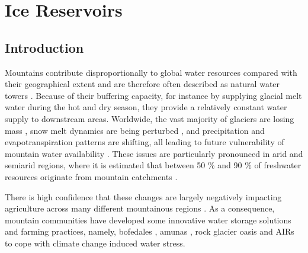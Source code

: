 \chapter{Ice Reservoirs}



\section{Introduction}

Mountains contribute disproportionally to global water resources compared with their geographical extent and are
therefore often described as natural water towers \citep{immerzeelImportanceVulnerabilityWorld2020}. Because of
their buffering capacity, for instance by supplying glacial melt water during the hot and dry season, they
provide a relatively constant water supply to downstream areas. Worldwide, the vast majority of glaciers are
losing mass \citep{zempGlobalGlacierMass2019a}, snow melt dynamics are being perturbed
\citep{mukhopadhyayReevaluationSnowmeltGlacial2015, hammondGlobalSnowZone2018}, and precipitation and
evapotranspiration patterns are shifting, all leading to future vulnerability of mountain water availability
\citep{lutzConsistentIncreaseHigh2014}. These issues are particularly pronounced in arid and semiarid regions,
where it is estimated that between 50 \% and 90 \% of freshwater resources originate from mountain catchments
\citep{mukhopadhyayReevaluationSnowmeltGlacial2015, messerliMountainsWorldVulnerable2004}. 

There is high confidence that these changes are largely negatively impacting agriculture across many different
mountainous regions \citep{ipccCrossChapterPaperMountains2022}. As a consequence, mountain communities have
developed some innovative water storage solutions and farming practices, namely, bofedales
\citep{monge-salazarEcohydrologyEcosystemServices2022}, amunas
\citep{ochoa-tocachiPotentialContributionsPreInca2019}, rock glacier oasis \citep{pandeyRockGlacierOasis2022}
and \ac{AIRs} \citep{wangchukIceStupaCompetition2020} to cope with climate change induced water stress.

